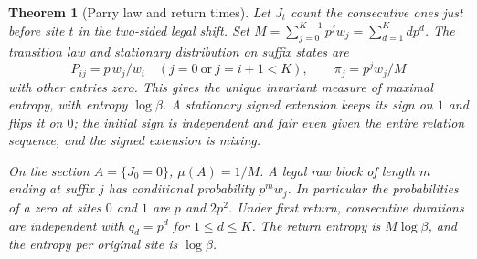 \documentclass[11pt,reqno]{amsart}
\newtheorem{theorem}{Theorem}[section]
\theoremstyle{definition}
\theoremstyle{remark}
\numberwithin{equation}{section}
\begin{document}
\begin{theorem}[Parry law and return times]\label{m9:parry}
Let \(J_t\) count the consecutive ones just before site \(t\) in the
two-sided legal shift. Set \(M=\sum_{j=0}^{K-1}p^j w_j=\sum_{d=1}^K d p^d\).
The transition law and stationary distribution on suffix states are
\[
 P_{ij}=p\,w_j/w_i\quad(j=0\ \text{or}\ j=i+1<K),\qquad
 \pi_j=p^j w_j/M
\]
with other entries zero. This gives the unique invariant measure of
maximal entropy, with entropy \(\log\beta\). A stationary signed
extension keeps its sign on \(1\) and flips it on \(0\); the initial
sign is independent and fair even given the entire relation sequence,
and the signed extension is mixing.

On the section \(A=\{J_0=0\}\), \(\mu(A)=1/M\).
A legal raw block of length \(m\) ending at suffix \(j\) has
conditional probability \(p^m w_j\). In particular the probabilities
of a zero at sites \(0\) and \(1\) are \(p\) and \(2p^2\).
Under first return, consecutive durations are independent with
\(q_d=p^d\) for \(1\le d\le K\). The return entropy is
\(M\log\beta\), and the entropy per original site is \(\log\beta\).
\end{theorem}
\end{document}
